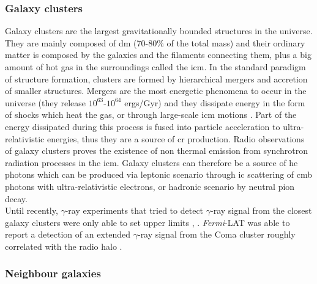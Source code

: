 \documentclass[main.tex]{subfiles}
\begin{document}
\subsubsection{Galaxy clusters} \label{sec:clusters}

Galaxy clusters are the largest gravitationally bounded structures in the universe. They are mainly composed of \gls{dm} (70-80\% of the total mass) and their ordinary matter is composed by the galaxies and the filaments connecting them, plus a big amount of hot gas in the surroundings called the \gls{icm}\cite{2017galaxyclusters}. In the standard paradigm of structure formation, clusters are formed by hierarchical mergers and accretion of smaller structures. Mergers are the most energetic phenomena to occur in the universe (they release $10^{63}$-$10^{64}$ ergs/Gyr) and they dissipate energy in the form of shocks which heat the gas, or through large-scale \gls{icm} motions \cite{2014CRinClusters}. Part of the energy dissipated during this process is fused into particle acceleration to ultra-relativistic energies, thus they are a source of \gls{cr} production. Radio observations of galaxy clusters proves the existence of non thermal emission from synchrotron radiation processes in the \gls{icm}. Galaxy clusters can therefore be a source of \gls{he} photons which can be produced via leptonic scenario through \gls{ic} scattering of \gls{cmb} photons with ultra-relativistic electrons, or hadronic scenario by neutral pion decay.\\

Until recently, $\gamma$-ray experiments that tried to detect $\gamma$-ray signal from the closest galaxy clusters were only able to set upper limits \cite{2010LimitsClustersFermi}, \cite{2012LimitsClustersMagic}. \textit{Fermi}-LAT was able to report a detection of an extended $\gamma$-ray signal from the Coma cluster roughly correlated with the radio halo \cite{2018ComaCluster}.\\

\subsubsection{Neighbour galaxies}
\end{document}
